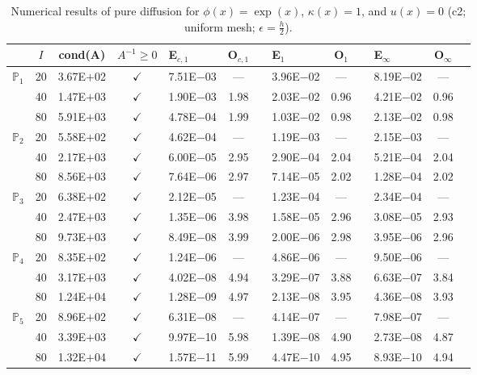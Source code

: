 \begin{table}[H]
\centering
\caption{Numerical results of pure diffusion for $\phi(x)=\exp(x)$, $\kappa(x)=1$, and $u(x)=0$ (c2; uniform mesh; $\epsilon=\frac{h}{2}$).}
\begin{tabular}{@{}l c c c l c c l c c l c c@{}}
\toprule
 & $I$ & cond(A) & $A^{-1}\geq 0$ &  E$_{c,1}$ & O$_{c,1}$ && E$_1$ & O$_1$ && E$_{\infty}$ & O$_{\infty}$\\
\midrule
\multirow{3}{*}{$\mathbb{P}_{1}$}
 & 20 & 3.67E$+$02 & $\checkmark$ & 7.51E$-$03 & --- && 3.96E$-$02 & --- && 8.19E$-$02 & ---\\
 & 40 & 1.47E$+$03 & $\checkmark$ & 1.90E$-$03 & 1.98 && 2.03E$-$02 & 0.96 && 4.21E$-$02 & 0.96\\
 & 80 & 5.91E$+$03 & $\checkmark$ & 4.78E$-$04 & 1.99 && 1.03E$-$02 & 0.98 && 2.13E$-$02 & 0.98\\
\midrule
\multirow{3}{*}{$\mathbb{P}_{2}$}
 & 20 & 5.58E$+$02 & $\checkmark$ & 4.62E$-$04 & --- && 1.19E$-$03 & --- && 2.15E$-$03 & ---\\
 & 40 & 2.17E$+$03 & $\checkmark$ & 6.00E$-$05 & 2.95 && 2.90E$-$04 & 2.04 && 5.21E$-$04 & 2.04\\
 & 80 & 8.56E$+$03 & $\checkmark$ & 7.64E$-$06 & 2.97 && 7.14E$-$05 & 2.02 && 1.28E$-$04 & 2.02\\
\midrule
\multirow{3}{*}{$\mathbb{P}_{3}$}
 & 20 & 6.38E$+$02 & $\checkmark$ & 2.12E$-$05 & --- && 1.23E$-$04 & --- && 2.34E$-$04 & ---\\
 & 40 & 2.47E$+$03 & $\checkmark$ & 1.35E$-$06 & 3.98 && 1.58E$-$05 & 2.96 && 3.08E$-$05 & 2.93\\
 & 80 & 9.73E$+$03 & $\checkmark$ & 8.49E$-$08 & 3.99 && 2.00E$-$06 & 2.98 && 3.95E$-$06 & 2.96\\
\midrule
\multirow{3}{*}{$\mathbb{P}_{4}$}
 & 20 & 8.35E$+$02 & $\checkmark$ & 1.24E$-$06 & --- && 4.86E$-$06 & --- && 9.50E$-$06 & ---\\
 & 40 & 3.17E$+$03 & $\checkmark$ & 4.02E$-$08 & 4.94 && 3.29E$-$07 & 3.88 && 6.63E$-$07 & 3.84\\
 & 80 & 1.24E$+$04 & $\checkmark$ & 1.28E$-$09 & 4.97 && 2.13E$-$08 & 3.95 && 4.36E$-$08 & 3.93\\
\midrule
\multirow{3}{*}{$\mathbb{P}_{5}$}
 & 20 & 8.96E$+$02 & $\checkmark$ & 6.31E$-$08 & --- && 4.14E$-$07 & --- && 7.98E$-$07 & ---\\
 & 40 & 3.39E$+$03 & $\checkmark$ & 9.97E$-$10 & 5.98 && 1.39E$-$08 & 4.90 && 2.73E$-$08 & 4.87\\
 & 80 & 1.32E$+$04 & $\checkmark$ & 1.57E$-$11 & 5.99 && 4.47E$-$10 & 4.95 && 8.93E$-$10 & 4.94\\
\bottomrule
\end{tabular}
\end{table}